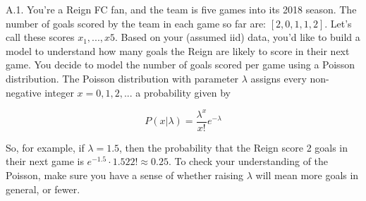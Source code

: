 \documentclass{article}
\newcommand{\1}{\mathbf{1}}
\begin{document}
A.1.  You’re a Reign FC fan, and the team is five games into its 2018 season. The number of goals scored by the team in each game so far are: $[2,0,1,1,2]$. Let’s call these scores $x_1,...,x5$.  Based on your (assumed iid) data, you’d like to build a model to understand how many goals the Reign are likely to score in their next game. You decide to model the number of goals scored per game using a Poisson  distribution. The Poisson distribution with parameter $\lambda$ assigns every non-negative integer $x=0,1,2,...$ a probability given by

$$P(x|\lambda)=\frac{\lambda^x}{x!}e^{-\lambda}$$

So, for example, if $\lambda=1.5$, then the probability that the Reign score 2 goals in their next game is $e^{-1.5}\cdot1.522!\approx0.25$. To check your understanding of the Poisson, make sure you have a sense of whether raising $\lambda$ will mean more goals in general, or fewer. 
\end{document}
